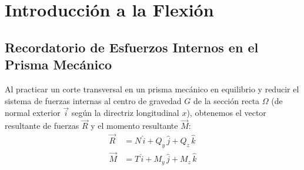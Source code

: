 \section{Introducción a la Flexión}

\subsection{Recordatorio de Esfuerzos Internos en el Prisma Mecánico}

Al practicar un corte transversal en un prisma mecánico en equilibrio y reducir el sistema de fuerzas internas al centro de gravedad $G$ de la sección recta $\Omega$ (de normal exterior $\vec{i}$ según la directriz longitudinal $x$), obtenemos el vector resultante de fuerzas $\vec{R}$ y el momento resultante $\vec{M}$:
\begin{align}
    \vec{R} & = N\,\hat{i} + Q_y\,\hat{j} + Q_z\,\hat{k} \\
    \vec{M} & = T\,\hat{i} + M_y\,\hat{j} + M_z\,\hat{k}
\end{align}

